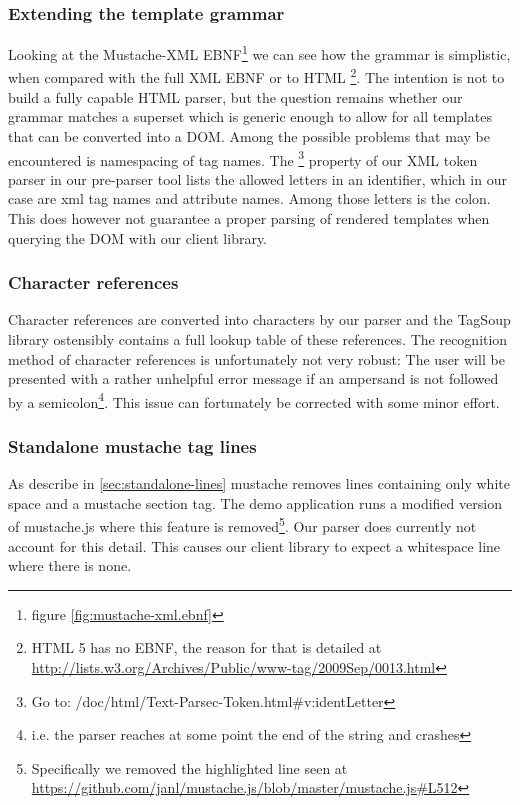 \documentclass[thesis.tex]{subfiles}
\begin{document}
\subsubsection{Extending the template grammar}
Looking at the Mustache-XML EBNF\footnote{figure \ref{fig:mustache-xml.ebnf}} we
can see how the grammar is simplistic, when compared with the
full XML \cite[section 2/\#sec-documents]{XMLSPEC} EBNF or to
HTML \cite{HTMLSPEC}\footnote{
	HTML 5 has no EBNF, the reason for that is detailed at
	\url{http://lists.w3.org/Archives/Public/www-tag/2009Sep/0013.html}
}. The intention is not to build a fully capable HTML parser, but the question
remains whether our grammar matches a superset which is generic enough to allow
for all templates that can be converted into a DOM. Among the possible problems
that may be encountered is namespacing of tag names. The 
\cite{PARSECDOC}\footnote{
	Go to: /doc/html/Text-Parsec-Token.html\#v:identLetter
} property of our XML token parser in our
pre-parser tool lists the allowed letters in an identifier,
which in our case are xml tag names and attribute names. Among those letters is
the colon. This does however not guarantee a proper parsing of rendered
templates when querying the DOM with our client library.

\subsubsection{Character references}
Character references are converted into characters by our parser and the
TagSoup library ostensibly contains a full lookup table of these references.
The recognition method of character references is unfortunately not very robust:
The user will be presented with a rather unhelpful error message if an ampersand
is not followed by a semicolon\footnote{
	i.e. the parser reaches at some point the end of the string and crashes
}. This issue can fortunately be corrected with some minor effort.

\subsubsection{Standalone mustache tag lines}
As describe in \ref{sec:standalone-lines} mustache removes
lines containing only white space and a mustache section tag.
The demo application runs a modified version of mustache.js where this feature
is removed\footnote{
	Specifically we removed the highlighted line seen at
	\url{https://github.com/janl/mustache.js/blob/master/mustache.js\#L512}
}. Our parser does currently not account for this detail. This causes
our client library to expect a whitespace line where there is none.
\end{document}
